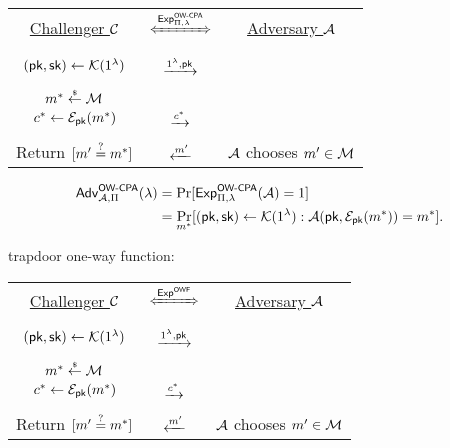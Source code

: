 \documentclass{article}
\begin{document}
\begin{tcolorbox}[colback=white]
	\centering
	\begin{tabularx}{\linewidth}{CcC}
		\underline{Challenger $\mathcal{C}$} & 
		$\xLeftrightarrow{\Exp^{\owcpa}_{\sch, \sp}}$ & 
		\underline{Adversary $\mathcal{A}$} \\

		 \\

		$(\textsf{pk}, \textsf{sk}) \gets \mathcal{K}(1^{\lambda})$ & 
		$\xrightarrow{1^{\lambda}, \textsf{pk}}$ & 
	   \\

		 \\

		$m^* \overset{{\scriptscriptstyle\$}}{\leftarrow} \mathcal{M}$ \\
		$c^* \gets \mathcal{E}_{\textsf{pk}}(m^*)$ &
		$\xrightarrow{c^*}$ &
		 \\

		 \\

		Return $[m' \overset{?}{=} m^*]$ & 
		$\xleftarrow{m'}$ & 
		$\mathcal{A}$ chooses $m' \in \mathcal{M}$ \\
  \end{tabularx}
\end{tcolorbox}

\begin{align}
	\begin{split}
		\textsf{Adv}^{\textsf{OW-CPA}}_{\mathcal{A}, \Pi}(\lambda)
		&= \Pr[\textsf{Exp}^{\textsf{OW-CPA}}_{\Pi, \lambda}(\mathcal{A}) = 1] \\
		&= \underset{m^*}{\Pr}[
				(\textsf{pk}, \textsf{sk}) \gets \mathcal{K}(1^{\lambda}): 
				\mathcal{A}(\textsf{pk}, \mathcal{E}_{\textsf{pk}}(m^*)) = m^*].
	\end{split}
\end{align}

trapdoor one-way function:

\begin{tcolorbox}[colback=white]
	\centering
	\begin{tabularx}{\linewidth}{CcC}
		\underline{Challenger $\mathcal{C}$} & 
		$\xLeftrightarrow{\Exp^{\owf}}$ & 
		\underline{Adversary $\mathcal{A}$} \\

		 \\

		$(\textsf{pk}, \textsf{sk}) \gets \mathcal{K}(1^{\lambda})$ & 
		$\xrightarrow{1^{\lambda}, \textsf{pk}}$ & 
	   \\

		 \\

		$m^* \overset{{\scriptscriptstyle\$}}{\leftarrow} \mathcal{M}$ \\
		$c^* \gets \mathcal{E}_{\textsf{pk}}(m^*)$ &
		$\xrightarrow{c^*}$ &
		 \\

		 \\

		Return $[m' \overset{?}{=} m^*]$ & 
		$\xleftarrow{m'}$ & 
		$\mathcal{A}$ chooses $m' \in \mathcal{M}$ \\
  \end{tabularx}
\end{tcolorbox}
\end{document}
